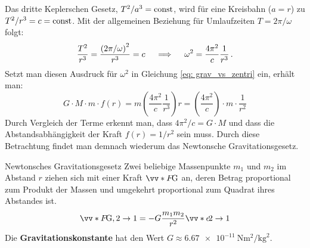 Das dritte Keplerschen Gesetz, $T^2/a^3 = \mathrm{const}$, wird für eine Kreisbahn ($a=r$) zu $T^2/r^3 = c = \mathrm{const}$. Mit der allgemeinen Beziehung für Umlaufzeiten $T = 2\pi/\omega$ folgt:
\begin{equation}\label{eq: omega_from_kepler3}
    \frac{T^2}{r^3} = \frac{{(2\pi/\omega)}^2}{r^3} = c \quad \implies \quad \omega^2 = \frac{4\pi^2}{c} \frac{1}{r^3} \,.
\end{equation}
Setzt man diesen Ausdruck für $\omega^2$ in Gleichung \cref{eq: grav_vs_zentri} ein, erhält man:
\begin{equation}
    G \cdot M \cdot m \cdot f(r) = m \left( \frac{4\pi^2}{c} \frac{1}{r^3} \right) r = \left( \frac{4\pi^2}{c} \right) \cdot m \cdot \frac{1}{r^2}
\end{equation}
Durch Vergleich der Terme erkennt man, dass $4\pi^2 /c = G\cdot M$ und dass die Abstandsabhängigkeit der Kraft $f(r) = 1/r^2$ sein muss. Durch diese Betrachtung findet man demnach wiederum das Newtonsche Gravitationsgesetz. 

\begin{rememberbox}[]{Newtonsches Gravitationsgesetz}
Zwei beliebige Massenpunkte $m_1$ und $m_2$ im Abstand $r$ ziehen sich mit einer Kraft $\ivecS{F}{\text{G}}$ an, deren Betrag proportional zum Produkt der Massen und umgekehrt proportional zum Quadrat ihres Abstandes ist. 
\begin{equation}\label{eq: newton_gravitation}
    \ivecS{F}{\text{G}, 2 \to 1} = -G \frac{m_1 m_2}{r^2} \ivecS{e}{2\rightarrow 1}
\end{equation}
Die \textbf{Gravitationskonstante} hat den Wert $G \approx \SI{6.67e-11}{\newton\metre\squared\per\kilogram\squared}$. 
\end{rememberbox}

